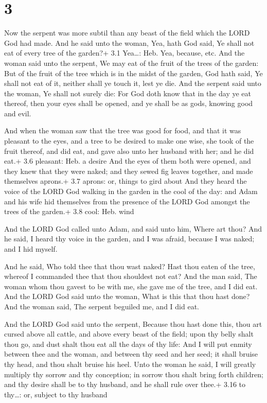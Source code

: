 \hypertarget{section-2}{%
\section{3}\label{section-2}}

 Now the serpent was more subtil than any beast of the field
which the LORD God had made. And he said unto the woman, Yea, hath God
said, Ye shall not eat of every tree of the garden?+ 3.1 Yea\ldots: Heb.
Yea, because, etc.  And the woman said unto the serpent, We
may eat of the fruit of the trees of the garden:  But of the
fruit of the tree which is in the midst of the garden, God hath said, Ye
shall not eat of it, neither shall ye touch it, lest ye die.
 And the serpent said unto the woman, Ye shall not surely
die:  For God doth know that in the day ye eat thereof, then
your eyes shall be opened, and ye shall be as gods, knowing good and
evil.

 And when the woman saw that the tree was good for food, and
that it was pleasant to the eyes, and a tree to be desired to make one
wise, she took of the fruit thereof, and did eat, and gave also unto her
husband with her; and he did eat.+ 3.6 pleasant: Heb. a desire
 And the eyes of them both were opened, and they knew that
they were naked; and they sewed fig leaves together, and made themselves
aprons.+ 3.7 aprons: or, things to gird about  And they
heard the voice of the LORD God walking in the garden in the cool of the
day: and Adam and his wife hid themselves from the presence of the LORD
God amongst the trees of the garden.+ 3.8 cool: Heb. wind

 And the LORD God called unto Adam, and said unto him, Where
art thou?  And he said, I heard thy voice in the garden,
and I was afraid, because I was naked; and I hid myself.

 And he said, Who told thee that thou wast naked? Hast thou
eaten of the tree, whereof I commanded thee that thou shouldest not eat?
 And the man said, The woman whom thou gavest to be with
me, she gave me of the tree, and I did eat.  And the LORD
God said unto the woman, What is this that thou hast done? And the woman
said, The serpent beguiled me, and I did eat.

 And the LORD God said unto the serpent, Because thou hast
done this, thou art cursed above all cattle, and above every beast of
the field; upon thy belly shalt thou go, and dust shalt thou eat all the
days of thy life:  And I will put enmity between thee and
the woman, and between thy seed and her seed; it shall bruise thy head,
and thou shalt bruise his heel.  Unto the woman he said, I
will greatly multiply thy sorrow and thy conception; in sorrow thou
shalt bring forth children; and thy desire shall be to thy husband, and
he shall rule over thee.+ 3.16 to thy\ldots: or, subject to thy husband

